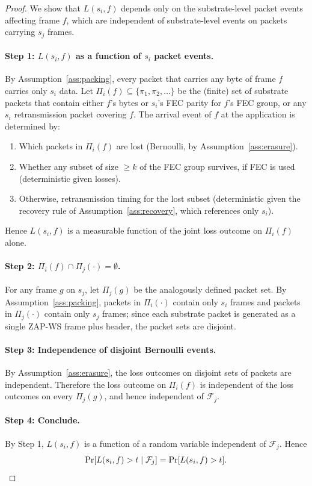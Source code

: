 \documentclass[11pt,a4paper]{article}
\begin{document}
\begin{proof}
We show that $L(s_i, f)$ depends only on the substrate-level packet
events affecting frame $f$, which are independent of substrate-level
events on packets carrying $s_j$ frames.

\paragraph{Step 1: $L(s_i, f)$ as a function of $s_i$ packet events.}
By Assumption~\ref{ass:packing}, every packet that carries any byte of
frame $f$ carries only $s_i$ data. Let $\Pi_i(f) \subseteq \{\pi_1,
\pi_2, \ldots\}$ be the (finite) set of substrate packets that contain
either $f$'s bytes or $s_i$'s FEC parity for $f$'s FEC group, or any
$s_i$ retransmission packet covering $f$. The arrival event of $f$ at
the application is determined by:
\begin{enumerate}[label=(\alph*)]
\item Which packets in $\Pi_i(f)$ are lost (Bernoulli, by
Assumption~\ref{ass:erasure}).
\item Whether any subset of size $\ge k$ of the FEC group survives, if
FEC is used (deterministic given losses).
\item Otherwise, retransmission timing for the lost subset
(deterministic given the recovery rule of Assumption~\ref{ass:recovery},
which references only $s_i$).
\end{enumerate}
Hence $L(s_i, f)$ is a measurable function of the joint loss outcome on
$\Pi_i(f)$ alone.

\paragraph{Step 2: $\Pi_i(f) \cap \Pi_j(\cdot) = \emptyset$.}
For any frame $g$ on $s_j$, let $\Pi_j(g)$ be the analogously defined
packet set. By Assumption~\ref{ass:packing}, packets in $\Pi_i(\cdot)$
contain only $s_i$ frames and packets in $\Pi_j(\cdot)$ contain only
$s_j$ frames; since each substrate packet is generated as a single
ZAP-WS frame plus header, the packet sets are disjoint.

\paragraph{Step 3: Independence of disjoint Bernoulli events.}
By Assumption~\ref{ass:erasure}, the loss outcomes on disjoint sets of
packets are independent. Therefore the loss outcome on $\Pi_i(f)$ is
independent of the loss outcomes on every $\Pi_j(g)$, and hence
independent of $\mathcal{F}_j$.

\paragraph{Step 4: Conclude.}
By Step 1, $L(s_i, f)$ is a function of a random variable independent
of $\mathcal{F}_j$. Hence
\[
\Pr[L(s_i, f) > t \mid \mathcal{F}_j] = \Pr[L(s_i, f) > t]. \qedhere
\]
\end{proof}
\end{document}
